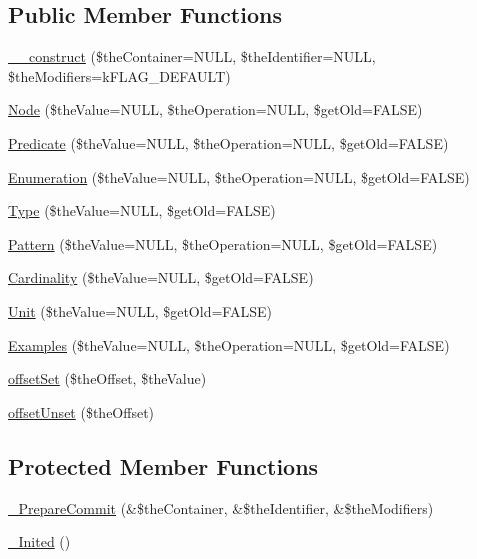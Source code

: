 \subsection*{Public Member Functions}
\begin{DoxyCompactItemize}
\item 
\hyperlink{class_c_ontology_term_a33679101b2a63044f0084918a8df123e}{\-\_\-\-\_\-construct} (\$the\-Container=N\-U\-L\-L, \$the\-Identifier=N\-U\-L\-L, \$the\-Modifiers=k\-F\-L\-A\-G\-\_\-\-D\-E\-F\-A\-U\-L\-T)
\item 
\hyperlink{class_c_ontology_term_a86fd6d9e2c98a68c1600975f18793239}{Node} (\$the\-Value=N\-U\-L\-L, \$the\-Operation=N\-U\-L\-L, \$get\-Old=F\-A\-L\-S\-E)
\item 
\hyperlink{class_c_ontology_term_aa275beb37c6697a8b9a6a6685f829afb}{Predicate} (\$the\-Value=N\-U\-L\-L, \$the\-Operation=N\-U\-L\-L, \$get\-Old=F\-A\-L\-S\-E)
\item 
\hyperlink{class_c_ontology_term_acbffa05d49c87a82d4ff71e93d3e732c}{Enumeration} (\$the\-Value=N\-U\-L\-L, \$the\-Operation=N\-U\-L\-L, \$get\-Old=F\-A\-L\-S\-E)
\item 
\hyperlink{class_c_ontology_term_afd46ef8241b696e99cf7b5e1334914b7}{Type} (\$the\-Value=N\-U\-L\-L, \$get\-Old=F\-A\-L\-S\-E)
\item 
\hyperlink{class_c_ontology_term_a6cf8cb14d45aae044d61ce8cab211d92}{Pattern} (\$the\-Value=N\-U\-L\-L, \$the\-Operation=N\-U\-L\-L, \$get\-Old=F\-A\-L\-S\-E)
\item 
\hyperlink{class_c_ontology_term_a0115abc39300d18a7d35014850d18a2e}{Cardinality} (\$the\-Value=N\-U\-L\-L, \$get\-Old=F\-A\-L\-S\-E)
\item 
\hyperlink{class_c_ontology_term_a81d71459e7696a821bdacaae7166483f}{Unit} (\$the\-Value=N\-U\-L\-L, \$get\-Old=F\-A\-L\-S\-E)
\item 
\hyperlink{class_c_ontology_term_a88a9743b98281665517ef3d5c16bed4c}{Examples} (\$the\-Value=N\-U\-L\-L, \$the\-Operation=N\-U\-L\-L, \$get\-Old=F\-A\-L\-S\-E)
\item 
\hyperlink{class_c_ontology_term_aba486e72f54e61651a75da75215aaa7c}{offset\-Set} (\$the\-Offset, \$the\-Value)
\item 
\hyperlink{class_c_ontology_term_a622c31b9466e49a1413d38fda9ef9bb1}{offset\-Unset} (\$the\-Offset)
\end{DoxyCompactItemize}
\subsection*{Protected Member Functions}
\begin{DoxyCompactItemize}
\item 
\hyperlink{class_c_ontology_term_a5d10f6baf1e484591d1d99b325e22d89}{\-\_\-\-Prepare\-Commit} (\&\$the\-Container, \&\$the\-Identifier, \&\$the\-Modifiers)
\item 
\hyperlink{class_c_ontology_term_a29fccef02b48fbf3fa63b4865f73ffe1}{\-\_\-\-Inited} ()
\end{DoxyCompactItemize}
